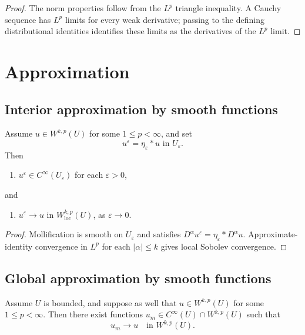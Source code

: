 \begin{proof}
\sketch The norm properties follow from the $L^p$ triangle inequality. A Cauchy sequence has $L^p$ limits for every weak derivative; passing to the defining distributional identities identifies these limits as the derivatives of the $L^p$ limit.
\end{proof}

\section{Approximation}
\label{sec:sobolev-approximation}

\subsection{Interior approximation by smooth functions}

\begin{theorem}
\label{thm:local-smooth-approximation}
Assume $u \in W^{k,p}(U)$ for some $1 \le p < \infty$, and set
$$u^\varepsilon = \eta_\varepsilon * u \text{ in } U_\varepsilon.$$
Then
\begin{enumerate}
\item[(i)] $u^\varepsilon \in C^\infty(U_\varepsilon)$ for each $\varepsilon > 0$,
\end{enumerate}
and
\begin{enumerate}
\item[(ii)] $u^\varepsilon \to u$ in $W^{k,p}_{\text{loc}}(U)$, as $\varepsilon \to 0$.
\end{enumerate}
\end{theorem}

\begin{proof}
\sketch Mollification is smooth on $U_\varepsilon$ and satisfies $D^\alpha u^\varepsilon=\eta_\varepsilon*D^\alpha u$. Approximate-identity convergence in $L^p$ for each $|\alpha|\le k$ gives local Sobolev convergence.
\end{proof}

\subsection{Global approximation by smooth functions}

\begin{theorem}
\label{thm:global-smooth-approximation-interior}
Assume $U$ is bounded, and suppose as well that $u \in W^{k,p}(U)$ for some $1 \le p < \infty$. Then there exist functions $u_m \in C^\infty(U) \cap W^{k,p}(U)$ such that
$$u_m \to u \quad \text{in } W^{k,p}(U).$$
\end{theorem}

